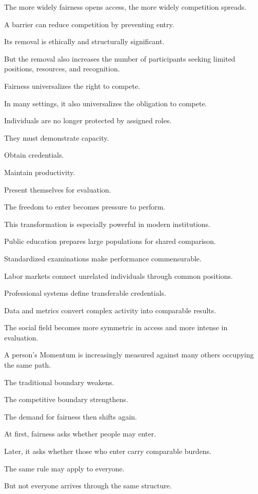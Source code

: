 The more widely fairness opens access, the more widely competition spreads.

A barrier can reduce competition by preventing entry.

Its removal is ethically and structurally significant.

But the removal also increases the number of participants seeking limited positions, resources, and recognition.

Fairness universalizes the right to compete.

In many settings, it also universalizes the obligation to compete.

Individuals are no longer protected by assigned roles.

They must demonstrate capacity.

Obtain credentials.

Maintain productivity.

Present themselves for evaluation.

The freedom to enter becomes pressure to perform.

This transformation is especially powerful in modern institutions.

Public education prepares large populations for shared comparison.

Standardized examinations make performance commensurable.

Labor markets connect unrelated individuals through common positions.

Professional systems define transferable credentials.

Data and metrics convert complex activity into comparable results.

The social field becomes more symmetric in access and more intense in evaluation.

A person’s Momentum is increasingly measured against many others occupying the same path.

The traditional boundary weakens.

The competitive boundary strengthens.

The demand for fairness then shifts again.

At first, fairness asks whether people may enter.

Later, it asks whether those who enter carry comparable burdens.

The same rule may apply to everyone.

But not everyone arrives through the same structure.

